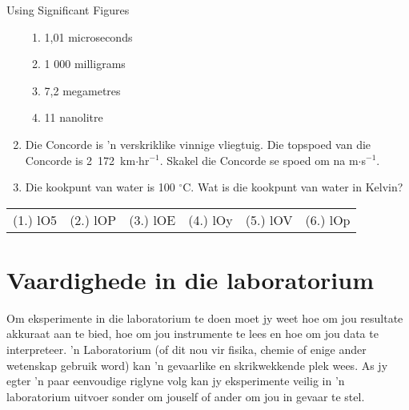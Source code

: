 \begin{exercises}{Using Significant Figures }
\begin{enumerate}[noitemsep, label=\textbf{\arabic*}. ]
\begin{enumerate}[noitemsep, label=\textbf{\alph*}. ]
  \item 1,01 microseconds
  \item 1 000 milligrams
  \item 7,2 megametres
  \item 11 nanolitre
  \end{enumerate}
  \item Die Concorde is  'n verskriklike vinnige vliegtuig. Die topspoed van die Concorde is 2~172~km$\ensuremath{\cdot}$hr${}^{-1}$. Skakel die Concorde se spoed om na m$\ensuremath{\cdot}$s${}^{-1}$.        
  \item Die kookpunt van water is 100 ${}^{\circ }$C. Wat is die kookpunt van water in Kelvin? 
\end{enumerate}
\par \practiceinfo
 \par \begin{tabular}[h]{cccccc}
  (1.) lO5  &  (2.) lOP  &  (3.) lOE  &  (4.) lOy  &  (5.) lOV  &  (6.) lOp \end{tabular}
\end{exercises}

\section{Vaardighede in die laboratorium}
Om eksperimente in die laboratorium te doen moet jy weet hoe om jou resultate akkuraat aan te bied, hoe om jou instrumente te lees en hoe om jou data te interpreteer.  'n Laboratorium (of dit nou vir fisika, chemie of enige ander wetenskap gebruik word) kan  'n gevaarlike en skrikwekkende plek wees. As jy egter  'n paar eenvoudige riglyne volg kan jy eksperimente veilig in  'n laboratorium uitvoer sonder om jouself of ander om jou in gevaar te stel.

